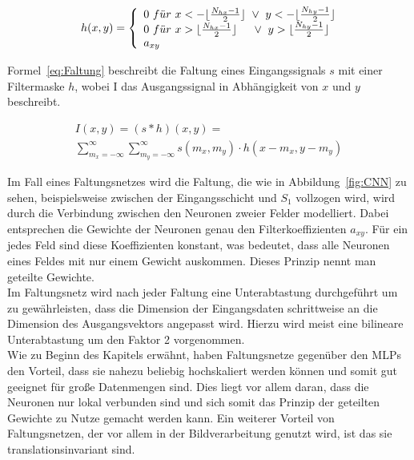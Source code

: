 \documentclass[times, 12pt,twocolumn]{article}
\begin{document}
\footnotesize
\begin{equation} 
	h(x,y) = \left\lbrace
  \begin{array}{l@{}l}
   0~f\ddot{u}r~x<-\lfloor\frac{N_{hx}-1}{2}\rfloor~\vee~y<-\lfloor\frac{N_{hy}-1}{2}\rfloor\\
    0~f\ddot{u}r~x>\lfloor\frac{N_{hx}-1}{2}\rfloor~~~~\vee~y>\lfloor\frac{N_{hy}-1}{2}\rfloor \\
    a_{xy}
  \end{array}
  \right.	
	\label{eq:Filtermaske}
\end{equation}
\small  

Formel~\ref{eq:Faltung} beschreibt die Faltung eines Eingangssignals $s$ mit einer Filtermaske $h$, wobei I das Ausgangssignal in Abhängigkeit von $x$ und $y$ beschreibt.

\footnotesize
\begin{equation}
\begin{aligned}
I(x,y) = (s*h)(x,y) = \\
\sum_{m_x=-\infty}^\infty \sum_{m_y=-\infty}^\infty s(m_x,m_y) \cdot h(x-m_x,y-m_y) 
\end{aligned}
	\label{eq:Faltung}
\end{equation}
\small

Im Fall eines Faltungsnetzes wird die Faltung, die wie in Abbildung~\ref{fig:CNN} zu sehen, beispielsweise zwischen der Eingangsschicht und $S_1$ vollzogen wird, wird durch die Verbindung zwischen den Neuronen zweier Felder modelliert. Dabei entsprechen die Gewichte der Neuronen genau den Filterkoeffizienten $a_{xy}$. Für ein jedes Feld sind diese Koeffizienten konstant, was bedeutet, dass alle Neuronen eines Feldes mit nur einem Gewicht auskommen. Dieses Prinzip nennt man geteilte Gewichte. \\

Im Faltungsnetz wird nach jeder Faltung eine Unterabtastung durchgeführt um zu gewährleisten, dass die Dimension der Eingangsdaten schrittweise an die Dimension des Ausgangsvektors angepasst wird. Hierzu wird meist eine bilineare Unterabtastung um den Faktor 2 vorgenommen. \\

Wie zu Beginn des Kapitels erwähnt, haben Faltungsnetze gegenüber den MLPs den Vorteil, dass sie nahezu beliebig hochskaliert werden können und somit gut geeignet für große Datenmengen sind. Dies liegt vor allem daran, dass die Neuronen nur lokal verbunden sind und sich somit das Prinzip der geteilten Gewichte zu Nutze gemacht werden kann. Ein weiterer Vorteil von Faltungsnetzen, der vor allem in der Bildverarbeitung genutzt wird, ist das sie translationsinvariant sind.
\end{document}
